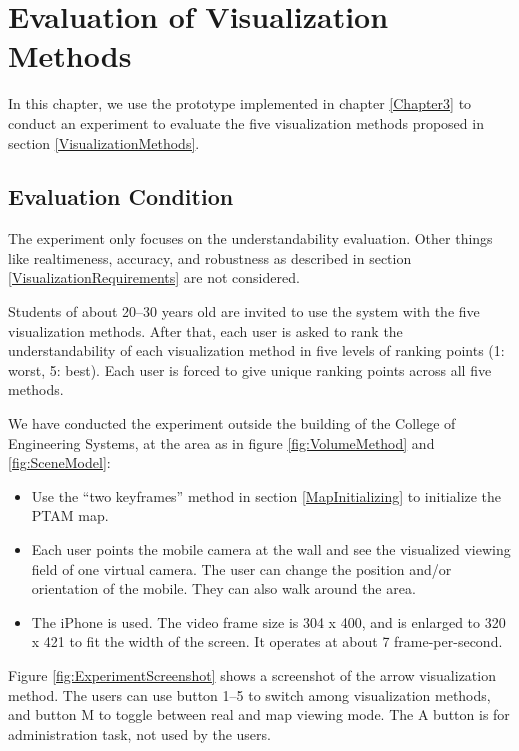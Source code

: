 \chapter{Evaluation of Visualization Methods}
\label{Chapter4}

In this chapter, we use the prototype implemented in chapter \ref{Chapter3} to conduct an experiment to evaluate the five visualization methods proposed in section \ref{VisualizationMethods}.


\section{Evaluation Condition}

The experiment only focuses on the understandability evaluation. Other things like realtimeness, accuracy, and robustness as described in section \ref{VisualizationRequirements} are not considered.

Students of about 20--30 years old are invited to use the system with the five visualization methods. After that, each user is asked to rank the understandability of each visualization method in five levels of ranking points (1: worst, 5: best). Each user is forced to give unique ranking points across all five methods.

We have conducted the experiment outside the building of the College of Engineering Systems, at the area as in figure \ref{fig:VolumeMethod} and \ref{fig:SceneModel}:

\begin{itemize}
	\item Use the ``two keyframes'' method in section \ref{MapInitializing} to initialize the PTAM map.
	\item Each user points the mobile camera at the wall and see the visualized viewing field of one virtual camera. The user can change the position and/or orientation of the mobile. They can also walk around the area.
	\item The iPhone is used. The video frame size is 304 x 400, and is enlarged to 320 x 421 to fit the width of the screen. It operates at about 7 frame-per-second.
\end{itemize}

Figure \ref{fig:ExperimentScreenshot} shows a screenshot of the arrow visualization method. The users can use button 1--5 to switch among visualization methods, and button M to toggle between real and map viewing mode. The A button is for administration task, not used by the users.


